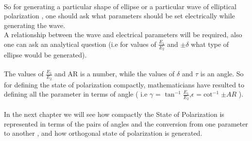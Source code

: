 \\So for generating a particular shape of ellipse or a particular wave of elliptical polarization , one should ask what parameters should be set electrically while generating the wave.
\\ A relationship between the wave and electrical parameters will be required, also one can ask an analytical question (i.e for values of $\frac{E_1}{E_2} $ and $ \pm \delta $ what type of ellipse would be generated).
\\
\\The values of $\frac{E_1}{E_2}$ and AR is a number, while the values of $\delta$ and $\tau $ is an angle. So for defining the state of polarization compactly, mathematicians have resulted to defining all the parameter in terms of angle ( i.e $\gamma $ = $\tan^{-1} {\frac{E_1}{E_2}} $,$\epsilon $ =$ \cot^{-1} {\pm AR} $ ). \\
\\In the next chapter we will see how compactly the State of Polarization is represented in terms of the pairs of angles and the conversion from one parameter to another , and how orthogonal state of polarization is generated.